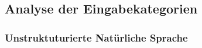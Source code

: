 \subsection{Analyse der Eingabekategorien}\label{ch:Analyse der Eingabekategorien}


\subsubsection{Unstruktuturierte Natürliche Sprache}\label{ch:Analyse der Eingabekategorien:Unstruktuturierte Natürliche Sprache}








